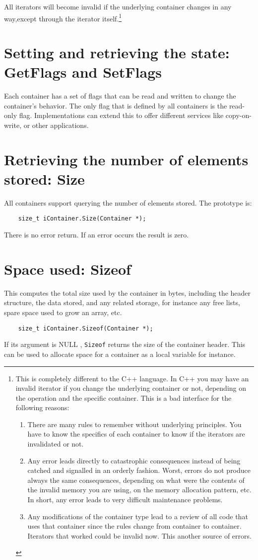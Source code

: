 \documentclass[12pt,a4paper]{memoir} %
\newcommand{\Null}{
{\footnotesize NULL}
}
\begin{document}
All iterators will become invalid if the underlying container changes in any way,except through the iterator itself.\footnote{This is completely different to the C++ language. In C++ you may have an invalid iterator if you change the underlying container or not, depending on the operation and the specific container. This is a bad interface for the following reasons:
\begin{enumerate}
\item There are many rules to remember without underlying principles.
  You have to know the specifics of each container to know
  if the iterators are invalidated or not.

\item Any error leads directly to catastrophic consequences instead
   of being catched and signalled in an orderly fashion. Worst, errors
   do not produce always the same consequences, depending on what
   were the contents of the invalid memory you are using, on the
   memory allocation pattern, etc. In short, any error leads to
   very difficult maintenance problems.

\item Any modifications of the container type lead to a review of
   all code that uses that container since the rules change from
   container to container. Iterators that worked could be invalid
   now. This another source of errors.
\end{enumerate}
}
\section{Setting and retrieving the state: GetFlags and SetFlags}
Each container has a set of flags that can be read and written to change the container's behavior. The only flag that is defined by all containers
is the read-only flag. Implementations can extend this to offer different services like copy-on-write, or other applications. 
\section{Retrieving the number of elements stored: Size}
All containers support querying the number of elements stored. The prototype is:
\begin{verbatim}
    size_t iContainer.Size(Container *);
\end{verbatim}
There is no error return. If an error occurs the result is zero.
\section{Space used: Sizeof}
This computes the total size used by the container in bytes, including the header structure, the data stored, and any related storage, for instance any free lists, spare space used to grow an array, etc.
\begin{verbatim}
    size_t iContainer.Sizeof(Container *);
\end{verbatim}
If its argument is\Null, \texttt{Sizeof} returns the size of the container header. This can be used to allocate space for a container as a local variable for instance.
\end{document}
